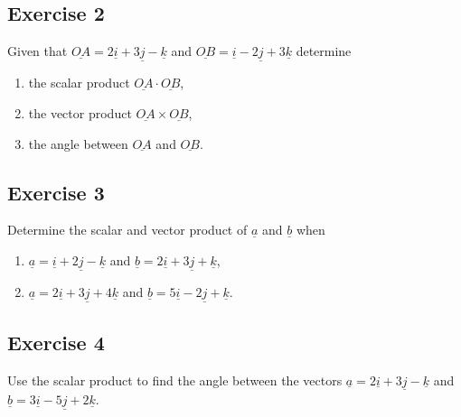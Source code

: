 \documentclass[
  11pt,
  oneside]{book}
\providecommand{\tightlist}{%
  \setlength{\itemsep}{0pt}\setlength{\parskip}{0pt}}
\newcommand{\slide}{}
\theoremstyle{definition}
\theoremstyle{definition}
\theoremstyle{definition}
\theoremstyle{definition}
\theoremstyle{remark}
\begin{document}
\slide

\subsection*{Exercise 2}\label{exercise-2-14}

Given that \(\underline{OA} = 2\underline{i} + 3\underline{j} - \underline{k}\) and \(\underline{OB} = \underline{i} - 2\underline{j} + 3\underline{k}\) determine

\begin{enumerate}
\def\labelenumi{\roman{enumi}.}
\tightlist
\item
  the scalar product \(\underline{OA}\cdot\underline{OB}\),
\item
  the vector product \(\underline{OA}\times\underline{OB}\),
\item
  the angle between \(\underline{OA}\) and \(\underline{OB}\).
\end{enumerate}

\slide

\subsection*{Exercise 3}\label{exercise-3-12}

Determine the scalar and vector product of \(\underline{a}\) and \(\underline{b}\) when

\begin{enumerate}
\def\labelenumi{\roman{enumi}.}
\tightlist
\item
  \(\underline{a} = \underline{i} + 2\underline{j} - \underline{k}\) and \(\underline{b} = 2\underline{i} + 3\underline{j} + \underline{k}\),
\item
  \(\underline{a} = 2\underline{i} + 3\underline{j} + 4\underline{k}\) and \(\underline{b} = 5\underline{i} - 2\underline{j} + \underline{k}\).
\end{enumerate}

\slide

\subsection*{Exercise 4}\label{exercise-4-10}

Use the scalar product to find the angle between the vectors \(\underline{a}=2\underline{i} + 3\underline{j} - \underline{k}\) and \(\underline{b}=3\underline{i} - 5\underline{j} + 2\underline{k}\).
\end{document}
